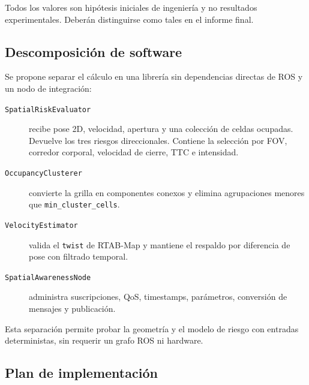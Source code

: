 Todos los valores son hipótesis iniciales de ingeniería y no resultados
experimentales. Deberán distinguirse como tales en el informe final.

\subsection{Descomposición de software}
\label{subsec:sa-software}

Se propone separar el cálculo en una librería sin dependencias directas de
ROS y un nodo de integración:
%
\begin{description}
  \item[\texttt{SpatialRiskEvaluator}] recibe pose 2D, velocidad, apertura y
    una colección de celdas ocupadas. Devuelve los tres riesgos direccionales.
    Contiene la selección por FOV, corredor corporal, velocidad de cierre, TTC
    e intensidad.

  \item[\texttt{OccupancyClusterer}] convierte la grilla en componentes
    conexos y elimina agrupaciones menores que
    \texttt{min\_cluster\_cells}.

  \item[\texttt{VelocityEstimator}] valida el \texttt{twist} de RTAB-Map y
    mantiene el respaldo por diferencia de pose con filtrado temporal.

  \item[\texttt{SpatialAwarenessNode}] administra suscripciones, QoS,
    timestamps, parámetros, conversión de mensajes y publicación.
\end{description}

Esta separación permite probar la geometría y el modelo de riesgo con entradas
deterministas, sin requerir un grafo ROS ni hardware.

\subsection{Plan de implementación}
\label{subsec:sa-plan}

